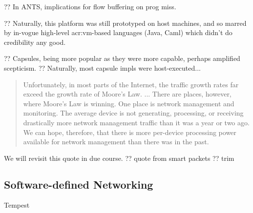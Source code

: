 ?? In ANTS, implications for flow buffering on prog miss.

?? Naturally, this platform was still prototyped on host machines, and so marred by in-vogue high-level \gls{acr:vm}-based languages (Java, Caml) which didn't do credibility any good.

?? Capsules, being more popular as they were more capable, perhaps amplified scepticism.
?? Naturally, most capsule impls were host-executed...

\begin{quotation}
	\noindent
	Unfortunately, in most parts of the Internet, the traffic growth rates far exceed the growth rate of Moore’s Law. ...
	There are places, however, where Moore’s Law is winning.
	One place is network management and monitoring.
	The average device is not generating, processing, or receiving drastically more network management traffic than it was a year or two ago.
	We can hope, therefore, that there is more per-device processing power available for network management than there was in the past.
	\strut\hfill\parencite[p. 68]{DBLP:journals/tocs/SchwartzJSZRP00}
\end{quotation}
We will revisit this quote in due course. ?? quote from smart packets ?? trim

\subsection{Software-defined Networking}

Tempest~\parencite{DBLP:journals/network/MerweRLC98}

